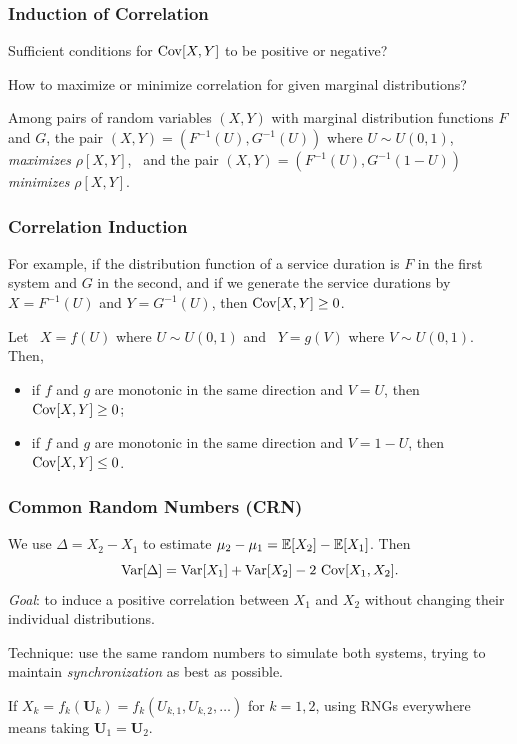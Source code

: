 \documentclass[t,usepdftitle=false,aspectratio=169]{beamer}
\def\bU{\boldsymbol{U}}
\begin{document}
\begin{frame}
	\frametitle{Induction of Correlation}
	
	Sufficient conditions for $\operatorname{Cov}[X,Y]$ 
	to be positive or negative?
	
	\mbox{}
	
	How to maximize or minimize correlation for given marginal distributions?
	
	\mbox{}
	
	\begin{theorem}
		Among pairs of random variables $(X,Y)$ with marginal 
		distribution functions $F$ and $G$, the pair $(X,Y) = (F^{-1}(U), G^{-1}(U))$ 
		where $U \sim U(0,1)$, \emph{maximizes} $\rho[X, Y]$, \
		and the pair $(X,Y) = (F^{-1}(U), G^{-1}(1-U))$
		\emph{minimizes} $\rho[X, Y]$.
	\end{theorem}
	
\end{frame}

\begin{frame}
	\frametitle{Correlation Induction}
	
	For example, if the distribution function of a service duration is 
	${F}$ in the first system and ${G}$ in the second,
	and if we generate the service durations by
	$X = F^{-1}(U)$ and $Y = G^{-1}(U)$, then $\operatorname{Cov}[X, Y] \ge 0$.
	
	\begin{theorem}
		Let \ ${X} = {f}(U)$ where ${U} \sim U(0,1)$ and \
		${Y} = {g}(V)$ where ${V} \sim U(0,1)$. Then,
		\begin{itemize}
			\item
			if $f$ and $g$ are monotonic in the same direction and $V=U$,
			then $\operatorname{Cov}[X, Y] \ge 0$;
			\item
			if $f$ and $g$ are monotonic in the same direction and $V=1-U$,
			then $\operatorname{Cov}[X, Y] \le 0$.
		\end{itemize}
	\end{theorem}
	
\end{frame}

\begin{frame}
	\frametitle{Common Random Numbers (CRN)}
	
	We use ${\Delta} = {X_2}-{X_1}$ to estimate ${\mu_2}-{\mu_1} = {\mathbb{E}}[X_2] - {\mathbb{E}}[X_1]$.
	Then
	\[
	\operatorname{Var}[\Delta] = \operatorname{Var}[X_1] + \operatorname{Var}[X_2] - 2 \, \operatorname{Cov}[X_1,X_2].
	\]
	\emph{Goal}: to induce a positive correlation between $X_1$ and $X_2$
	without changing their individual distributions.
	
	\mbox{}
	
	Technique: use the same random numbers to simulate
	both systems, trying to maintain \emph{synchronization}
	as best as possible.
	
	\mbox{}
	
	If $X_k = {f_k}(\bU_k) = f_k({U_{k,1}},{U_{k,2}},\dots)$ 
	for $k=1,2$, using RNGs everywhere means taking $\bU_1=\bU_2$.
	
\end{frame}
\end{document}
